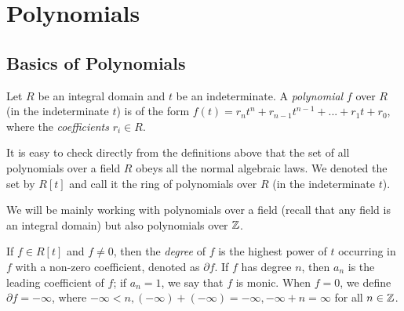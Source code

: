 
\section{Polynomials}
\subsection{Basics of Polynomials}

\begin{definition}
    Let $R$ be an integral domain and $t$ be an indeterminate. A \textit{polynomial} $f$ over $R$ (in the indeterminate $t$) is of the form $f(t) = r_n t^n + r_{n-1} t^{n-1} + ... + r_1 t + r_0$, where the \textit{coefficients} $r_i \in R$. 
\end{definition}

It is easy to check directly from the definitions above that the set of all polynomials over a field $R$ obeys all the normal algebraic laws. We denoted the set by $R[t]$ and call it the ring of polynomials over $R$ (in the indeterminate $t$).

We will be mainly working with polynomials over a field (recall that any field is an integral domain) but also polynomials over $\mathbb Z$.

\begin{definition}
	If $f \in R[t]$ and $f \neq 0$, then the \textit{degree} of $f$ is the highest power of $t$ occurring in $f$ with a non-zero coefficient, denoted as $\partial f$. If $f$ has degree $n$, then $a_n$ is the leading coefficient of $f$; if $a_n = 1$, we say that $f$ is monic. When $f = 0$, we define $\partial f = - \infty$, where $-\infty < n, (-\infty) + (- \infty) = -\infty, -\infty + n = \infty$ for all $n \in \mathbb Z$. 
\end{definition}




%
%    

